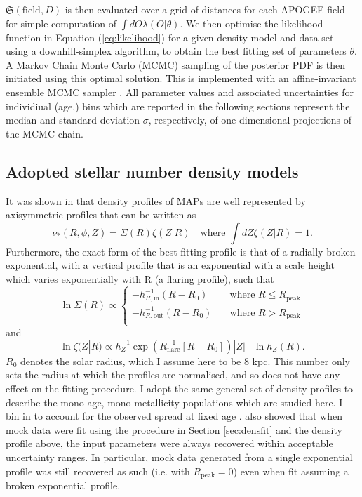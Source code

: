 $\mathfrak{S}(\text{field}, D)$ is then evaluated over a grid of distances for each APOGEE field for simple computation of $\int dO \lambda(O|\theta)$. We then optimise the likelihood function in Equation (\ref{eq:likelihood}) for a given density model and data-set using a downhill-simplex algorithm, to obtain the best fitting set of parameters $\theta$. A Markov Chain Monte Carlo (MCMC) sampling of the posterior PDF is then initiated using this optimal solution. This is implemented with an affine-invariant ensemble MCMC sampler  \citep{goodmanweare2010,2013PASP..125..306F}. All parameter values and associated uncertainties for individiual (age,\feh{}) bins which are reported in the following sections represent the median and standard deviation $\sigma$, respectively, of one dimensional projections of the MCMC chain. 

 \subsection{Adopted stellar number density models}
 \label{sec:densitymodel}
 It was shown in \citet{2016ApJ...823...30B} that density profiles of MAPs are well represented by axisymmetric profiles that can be written as 
\begin{equation}
 \nu_*(R, \phi, Z) = \Sigma(R)\zeta(Z|R) \quad \text{where } \int dZ \zeta(Z|R) = 1.
 \end{equation}
 Furthermore, the exact form of the best fitting profile is that of a radially broken exponential, with a vertical profile that is an exponential with a scale height which varies exponentially with R (a flaring profile), such that
 \begin{equation}
 \ln \Sigma(R) \propto  \begin{cases}
     -h_{R,\text{in}}^{-1}(R-R_0)    & \quad \text{where } R \leq R_{\text{peak}}\\
   -h_{R,\text{out}}^{-1}(R-R_0)  &\quad \text{where } R > R_{\text{peak}}\\
   \end{cases}
 \end{equation}
 and
 \begin{equation}
 \ln \zeta(Z|R) \propto h_Z^{-1} \exp{(R_{\mathrm{flare}}^{-1}[R-R_0])} |Z|-\ln{h_Z(R)}.
 \end{equation}
$R_0$ denotes the solar radius, which I assume here to be 8 kpc. This number only sets the radius at which the profiles are normalised, and so does not have any effect on the fitting procedure. I adopt the same general set of density profiles to describe the mono-age, mono-metallicity populations which are studied here. I bin in \feh{} to account for the observed \feh{} spread at fixed age \citep[e.g.][and our Figure \ref{fig:numbins}]{1993A&A...275..101E}. \citet{2016ApJ...823...30B} also showed that when mock data were fit using the procedure in Section \ref{sec:densfit} and the density profile above, the input parameters were always recovered within acceptable uncertainty ranges. In particular, mock data generated from a single exponential profile was still recovered as such (i.e. with $R_{\mathrm{peak}} = 0$) even when fit assuming a broken exponential profile.

